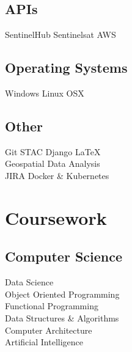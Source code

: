 \documentclass[letterpaper]{AMcEnaneyResume} %
\begin{document}
\begin{minipage}[t]{0.33\textwidth}
        \sectionspace

    \subsection{APIs}

        \textbullet{} SentinelHub \textbullet{} Sentinelsat \textbullet{} AWS
        
        \sectionspace

    \subsection{Operating Systems}
        \textbullet{} Windows \textbullet{} Linux \textbullet{} OSX
        
        \sectionspace

    \subsection{Other}
        \textbullet{} Git \textbullet{} STAC \textbullet{} Django \textbullet{} \LaTeX \\ \textbullet{} Geospatial Data Analysis \\ 
        \textbullet{} JIRA \textbullet{} Docker \& Kubernetes

    \sectionspace %


\section{Coursework}


    \subsection{Computer Science}

        \textbullet{} Data Science \\
        \textbullet{} Object Oriented Programming \\
        \textbullet{} Functional Programming \\
        \textbullet{} Data Structures \& Algorithms \\
        \textbullet{} Computer Architecture \\
        \textbullet{} Artificial Intelligence \\
        

\end{minipage}
\end{document}
